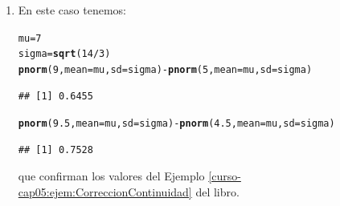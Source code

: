 \documentclass[10pt,a4paper]{article}\usepackage[]{graphicx}\usepackage[]{color}
\makeatletter
\newcommand{\hlnum}[1]{\textcolor[rgb]{0.686,0.059,0.569}{#1}}%
\newcommand{\hlopt}[1]{\textcolor[rgb]{0,0,0}{#1}}%
\newcommand{\hlstd}[1]{\textcolor[rgb]{0.345,0.345,0.345}{#1}}%
\newcommand{\hlkwb}[1]{\textcolor[rgb]{0.69,0.353,0.396}{#1}}%
\newcommand{\hlkwc}[1]{\textcolor[rgb]{0.333,0.667,0.333}{#1}}%
\newcommand{\hlkwd}[1]{\textcolor[rgb]{0.737,0.353,0.396}{\textbf{#1}}}%
\newenvironment{kframe}{%
 \def\at@end@of@kframe{}%
 \ifinner\ifhmode%
  \def\at@end@of@kframe{\end{minipage}}%
  \begin{minipage}{\columnwidth}%
 \fi\fi%
 \def\FrameCommand##1{\hskip\@totalleftmargin \hskip-\fboxsep
 \colorbox{shadecolor}{##1}\hskip-\fboxsep
     \hskip-\linewidth \hskip-\@totalleftmargin \hskip\columnwidth}%
 \MakeFramed {\advance\hsize-\width
   \@totalleftmargin\z@ \linewidth\hsize
   \@setminipage}}%
 {\par\unskip\endMakeFramed%
 \at@end@of@kframe}
\newenvironment{knitrout}{}{} %
\makeatother
\begin{document}
\begin{enumerate}
\begin{enumerate}
        \end{enumerate}

  \item En este caso tenemos:
\begin{knitrout}
\color{fgcolor}\begin{kframe}
\begin{alltt}
    \hlstd{mu} \hlkwb{=} \hlnum{7}
    \hlstd{sigma} \hlkwb{=} \hlkwd{sqrt}\hlstd{(}\hlnum{14}\hlopt{/}\hlnum{3}\hlstd{)}
    \hlkwd{pnorm}\hlstd{(}\hlnum{9}\hlstd{,} \hlkwc{mean}\hlstd{=mu,} \hlkwc{sd}\hlstd{=sigma)} \hlopt{-} \hlkwd{pnorm}\hlstd{(}\hlnum{5}\hlstd{,} \hlkwc{mean}\hlstd{=mu,} \hlkwc{sd}\hlstd{=sigma)}
\end{alltt}
\begin{verbatim}
## [1] 0.6455
\end{verbatim}
\begin{alltt}
    \hlkwd{pnorm}\hlstd{(}\hlnum{9.5}\hlstd{,} \hlkwc{mean}\hlstd{=mu,} \hlkwc{sd}\hlstd{=sigma)} \hlopt{-} \hlkwd{pnorm}\hlstd{(}\hlnum{4.5}\hlstd{,} \hlkwc{mean}\hlstd{=mu,} \hlkwc{sd}\hlstd{=sigma)}
\end{alltt}
\begin{verbatim}
## [1] 0.7528
\end{verbatim}
\end{kframe}
\end{knitrout}
          que confirman los valores del Ejemplo \ref{curso-cap05:ejem:CorreccionContinuidad} del libro.

\end{enumerate}
\end{document}
